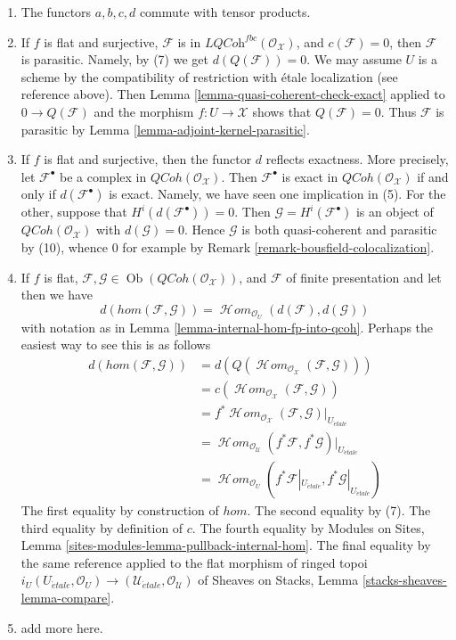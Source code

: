 \documentclass{stacks-project}
\theoremstyle{plain}
\theoremstyle{definition}
\theoremstyle{remark}
\numberwithin{equation}{subsection}
\def\SheafHom{\mathop{\mathcal{H}\!\mathit{om}}\nolimits}
\def\Ob{\mathop{\mathrm{Ob}}\nolimits}
\def\etale{{\acute{e}tale}}
\def\QCoh{\mathit{QCoh}}
\begin{document}
\begin{enumerate}
\item The functors $a, b, c, d$ commute with tensor products.
\item If $f$ is flat and surjective, $\mathcal{F}$ is in
$\textit{LQCoh}^{fbc}(\mathcal{O}_\mathcal{X})$, and $c(\mathcal{F}) = 0$,
then $\mathcal{F}$ is parasitic. Namely, by (7) we get $d(Q(\mathcal{F})) = 0$.
We may assume $U$ is a scheme by the compatibility of restriction
with \'etale localization (see reference above). Then
Lemma \ref{lemma-quasi-coherent-check-exact} applied to $0 \to Q(\mathcal{F})$
and the morphism $f : U \to \mathcal{X}$ shows that $Q(\mathcal{F}) = 0$.
Thus $\mathcal{F}$ is parasitic by Lemma \ref{lemma-adjoint-kernel-parasitic}.
\item If $f$ is flat and surjective, then the functor $d$
reflects exactness. More precisely, let $\mathcal{F}^\bullet$ be a complex in
$\QCoh(\mathcal{O}_\mathcal{X})$. Then $\mathcal{F}^\bullet$ is exact
in $\QCoh(\mathcal{O}_\mathcal{X})$ if and only if $d(\mathcal{F}^\bullet)$
is exact. Namely, we have seen one implication in (5). For the other,
suppose that $H^i(d(\mathcal{F}^\bullet)) = 0$. Then
$\mathcal{G} = H^i(\mathcal{F}^\bullet)$ is an object of
$\QCoh(\mathcal{O}_\mathcal{X})$ with $d(\mathcal{G}) = 0$.
Hence $\mathcal{G}$ is both quasi-coherent and parasitic by (10),
whence $0$ for example by Remark \ref{remark-bousfield-colocalization}.
\item
\label{item-hom-restriction}
If $f$ is flat,
$\mathcal{F}, \mathcal{G} \in \Ob(\QCoh(\mathcal{O}_\mathcal{X}))$,
and $\mathcal{F}$ of finite presentation and let
then we have
$$
d(hom(\mathcal{F}, \mathcal{G})) =
\SheafHom_{\mathcal{O}_U}(d(\mathcal{F}), d(\mathcal{G}))
$$
with notation as in Lemma \ref{lemma-internal-hom-fp-into-qcoh}.
Perhaps the easiest way to see this is as follows
\begin{align*}
d(hom(\mathcal{F}, \mathcal{G}))
& =
d(Q(\SheafHom_{\mathcal{O}_\mathcal{X}}(\mathcal{F}, \mathcal{G}))) \\
& =
c(\SheafHom_{\mathcal{O}_\mathcal{X}}(\mathcal{F}, \mathcal{G})) \\
& =
f^*\SheafHom_{\mathcal{O}_\mathcal{X}}(\mathcal{F}, \mathcal{G})|_{U_\etale} \\
& =
\SheafHom_{\mathcal{O}_\mathcal{U}}(f^*\mathcal{F},
f^*\mathcal{G})|_{U_\etale} \\
& =
\SheafHom_{\mathcal{O}_U}(f^*\mathcal{F}|_{U_\etale},
f^*\mathcal{G}|_{U_\etale})
\end{align*}
The first equality by construction of $hom$. The second equality
by (7). The third equality by definition of $c$. The fourth equality
by Modules on Sites, Lemma \ref{sites-modules-lemma-pullback-internal-hom}.
The final equality by the same reference applied to the flat morphism
of ringed topoi $i_U (U_\etale, \mathcal{O}_U) \to
(\mathcal{U}_\etale, \mathcal{O}_\mathcal{U})$ of
Sheaves on Stacks, Lemma \ref{stacks-sheaves-lemma-compare}.
\item add more here.
\end{enumerate}
\end{document}
